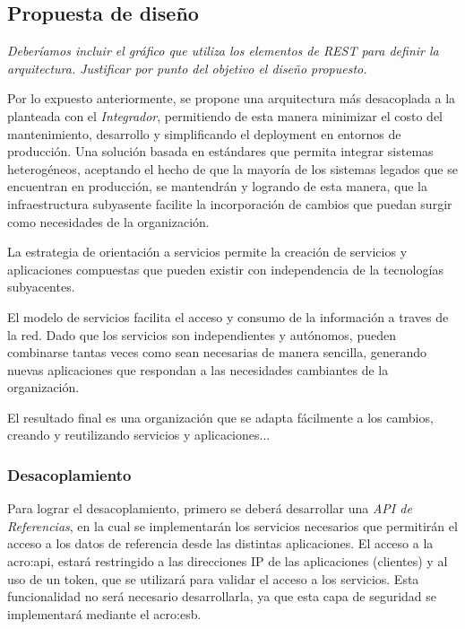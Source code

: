 \subsection{Propuesta de diseño}
\label{propuesta}

\textit{Deberíamos incluir el gráfico que utiliza los elementos de REST para definir la arquitectura. Justificar por punto del objetivo el diseño propuesto.}\\



Por lo expuesto anteriormente, se propone una arquitectura más desacoplada a la planteada con el \textit{Integrador}, permitiendo de esta manera minimizar el costo del mantenimiento, desarrollo y simplificando el deployment en entornos de producción.  Una solución basada en estándares que permita integrar sistemas heterogéneos, aceptando el hecho de que la mayoría de los sistemas legados que se encuentran en producción, se mantendrán y logrando de esta manera, que la infraestructura subyasente facilite la incorporación de cambios que puedan surgir como necesidades de la organización.

La estrategia de orientación a servicios permite la creación de servicios y aplicaciones compuestas que pueden existir con independencia de la tecnologías subyacentes\cite{microsoft2006}.

El modelo de servicios facilita el acceso y consumo de la información a traves de la red.  Dado que los servicios son independientes y autónomos, pueden combinarse tantas veces como sean necesarias de manera sencilla, generando nuevas aplicaciones que respondan a las necesidades cambiantes de la organización.

El resultado final es una organización que se adapta fácilmente a los cambios, creando y reutilizando servicios y aplicaciones...


\subsubsection{Desacoplamiento}

Para lograr el desacoplamiento, primero se deberá desarrollar una \textit{API de Referencias}, en la cual se implementarán los servicios necesarios que permitirán el acceso a los datos de referencia desde las distintas aplicaciones.  El acceso a la \gls{acro:api}, estará restringido a las direcciones IP de las aplicaciones (clientes) y al uso de un token, que se utilizará para validar el acceso a los servicios.  Esta funcionalidad no será necesario desarrollarla, ya que esta capa de seguridad se implementará mediante el \gls{acro:esb}.

